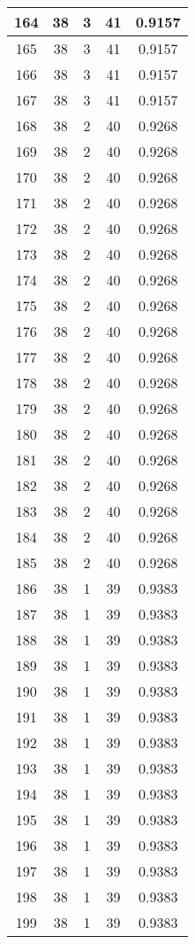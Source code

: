 \documentclass[letterpaper, 12pt]{article}
\begin{document}
\begin{longtable}{|c|c|c|c|c|}
\hline
164 & 38 & 3 & 41 & 0.9157 \\
\hline
165 & 38 & 3 & 41 & 0.9157 \\
\hline
166 & 38 & 3 & 41 & 0.9157 \\
\hline
167 & 38 & 3 & 41 & 0.9157 \\
\hline
168 & 38 & 2 & 40 & 0.9268 \\
\hline
169 & 38 & 2 & 40 & 0.9268 \\
\hline
170 & 38 & 2 & 40 & 0.9268 \\
\hline
171 & 38 & 2 & 40 & 0.9268 \\
\hline
172 & 38 & 2 & 40 & 0.9268 \\
\hline
173 & 38 & 2 & 40 & 0.9268 \\
\hline
174 & 38 & 2 & 40 & 0.9268 \\
\hline
175 & 38 & 2 & 40 & 0.9268 \\
\hline
176 & 38 & 2 & 40 & 0.9268 \\
\hline
177 & 38 & 2 & 40 & 0.9268 \\
\hline
178 & 38 & 2 & 40 & 0.9268 \\
\hline
179 & 38 & 2 & 40 & 0.9268 \\
\hline
180 & 38 & 2 & 40 & 0.9268 \\
\hline
181 & 38 & 2 & 40 & 0.9268 \\
\hline
182 & 38 & 2 & 40 & 0.9268 \\
\hline
183 & 38 & 2 & 40 & 0.9268 \\
\hline
184 & 38 & 2 & 40 & 0.9268 \\
\hline
185 & 38 & 2 & 40 & 0.9268 \\
\hline
186 & 38 & 1 & 39 & 0.9383 \\
\hline
187 & 38 & 1 & 39 & 0.9383 \\
\hline
188 & 38 & 1 & 39 & 0.9383 \\
\hline
189 & 38 & 1 & 39 & 0.9383 \\
\hline
190 & 38 & 1 & 39 & 0.9383 \\
\hline
191 & 38 & 1 & 39 & 0.9383 \\
\hline
192 & 38 & 1 & 39 & 0.9383 \\
\hline
193 & 38 & 1 & 39 & 0.9383 \\
\hline
194 & 38 & 1 & 39 & 0.9383 \\
\hline
195 & 38 & 1 & 39 & 0.9383 \\
\hline
196 & 38 & 1 & 39 & 0.9383 \\
\hline
197 & 38 & 1 & 39 & 0.9383 \\
\hline
198 & 38 & 1 & 39 & 0.9383 \\
\hline
199 & 38 & 1 & 39 & 0.9383 \\
\hline
\end{longtable}
\end{document}
